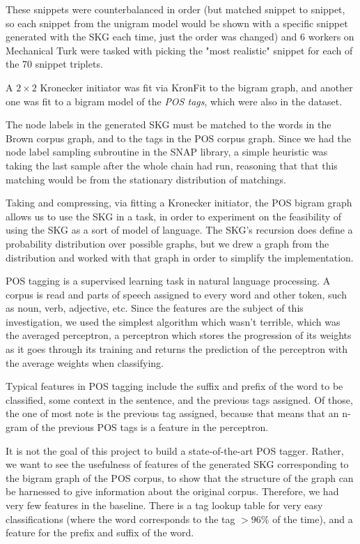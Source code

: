 \documentclass[12pt]{article}
\begin{document}
These snippets were counterbalanced in order (but matched snippet to snippet, so each snippet from the unigram model would be shown with a specific snippet generated with the SKG each time, just the order was changed) and 6 workers on Mechanical Turk were tasked with picking the "most realistic" snippet for each of the 70 snippet triplets.

A $2 \times 2$ Kronecker initiator was fit via KronFit to the bigram graph, and another one was fit to a bigram model of the \emph{POS tags}, which were also in the dataset. %

The node labels in the generated SKG must be matched to the words in the Brown corpus graph, and to the tags in the POS corpus graph. Since we had the node label sampling subroutine in the SNAP library, a simple heuristic was taking the last sample after the whole chain had run, reasoning that that this matching would be from the stationary distribution of matchings.

Taking and compressing, via fitting a Kronecker initiator, the POS bigram graph allows us to use the SKG in a task, in order to experiment on the feasibility of using the SKG as a sort of model of language. The SKG's recursion does define a probability distribution over possible graphs, but we drew a graph from the distribution and worked with that graph in order to simplify the implementation.

POS tagging is a supervised learning task in natural language processing. A corpus is read and parts of speech assigned to every word and other token, such as noun, verb, adjective, etc. Since the features are the subject of this investigation, we used the simplest algorithm which wasn't terrible, which was the averaged perceptron, a perceptron which stores the progression of its weights as it goes through its training and returns the prediction of the perceptron with the average weights when classifying. %

Typical features in POS tagging include the suffix and prefix of the word to be classified, some context in the sentence, and the previous tags assigned. Of those, the one of most note is the previous tag assigned, because that means that an n-gram of the previous POS tags is a feature in the perceptron. %

It is not the goal of this project to build a state-of-the-art POS tagger. Rather, we want to see the usefulness of features of the generated SKG corresponding to the bigram graph of the POS corpus, to show that the structure of the graph can be harnessed to give information about the original corpus. Therefore, we had very few features in the baseline. There is a tag lookup table for very easy classifications (where the word corresponds to the tag $>96\%$ of the time), and a feature for the prefix and suffix of the word.
\end{document}

